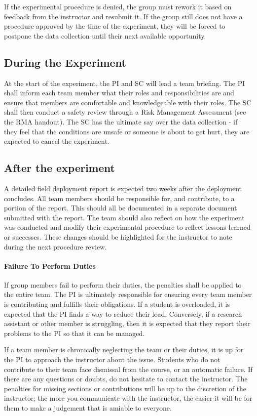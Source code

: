 \documentclass[
	letterpaper, %
	fontsize=10pt, %
	twoside=true, %
	numbers=noenddot, %
]{kaobook}
\begin{document}
If the experimental procedure is denied, the group must rework it based on feedback from the instructor and resubmit it.
If the group still does not have a procedure approved by the time of the experiment, they will be forced to postpone the data collection until their next available opportunity.

\subsection*{During the Experiment}
At the start of the experiment, the PI and SC will lead a team briefing.
The PI shall inform each team member what their roles and responsibilities are and ensure that members are comfortable and knowledgeable with their roles.
The SC shall then conduct a safety review through a Risk Management Assessment (see the RMA handout).
The SC has the ultimate say over the data collection - if they feel that the conditions are unsafe or someone is about to get hurt, they are expected to cancel the experiment.

\subsection*{After the experiment}
A detailed field deployment report is expected two weeks after the deployment concludes.
All team members should be responsible for, and contribute, to a portion of the report.
This should all be documented in a separate document submitted with the report.
The team should also reflect on how the experiment was conducted and modify their experimental procedure to reflect lessons learned or successes.
These changes should be highlighted for the instructor to note during the next procedure review.

\paragraph*{Failure To Perform Duties} If group members fail to perform their duties, the penalties shall be applied to the entire team.
The PI is ultimately responsible for ensuring every team member is contributing and fulfills their obligations.
If a student is overloaded, it is expected that the PI finds a way to reduce their load.
Conversely, if a research assistant or other member is struggling, then it is expected that they report their problems to the PI so that it can be managed.

If a team member is chronically neglecting the team or their duties, it is up for the PI to approach the instructor about the issue.
Students who do not contribute to their team face dismissal from the course, or an automatic failure.
If there are any questions or doubts, do not hesitate to contact the instructor.
The penalties for missing sections or contributions will be up to the discretion of the instructor; the more you communicate with the instructor, the easier it will be for them to make a judgement that is amiable to everyone.
\end{document}
